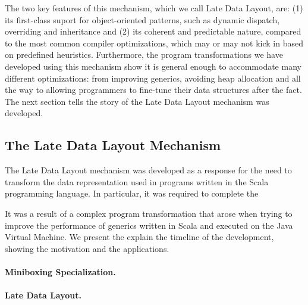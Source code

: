 The two key features of this mechanism, which we call Late Data Layout, are: (1) its first-class suport for object-oriented patterns, such as dynamic dispatch, overriding and inheritance and (2) its coherent and predictable nature, compared to the most common compiler optimizations, which may or may not kick in based on predefined heuristics. Furthermore, the program transformations we have developed using this mechanism show it is general enough to accommodate many different optimizations: from improving generics, avoiding heap allocation and all the way to allowing programmers to fine-tune their data structures after the fact. The next section tells the story of the Late Data Layout mechanism was developed.

\subsection{The Late Data Layout Mechanism}

The Late Data Layout mechanism was developed as a response for the need to transform the data representation used in programs written in the Scala programming language. In particular, it was required to complete the

It was a result of a complex program transformation that arose when trying to improve the performance of generics written in Scala and executed on the Java Virtual Machine. We present the explain the timeline of the development, showing the motivation and the applications.

\paragraph*{Miniboxing Specialization.}





\paragraph*{Late Data Layout.}


